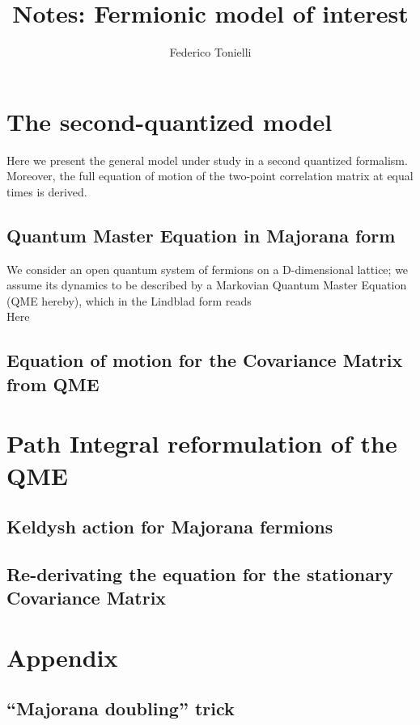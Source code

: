 \documentclass[a4paper,11pt]{amsart}
\title{Notes: Fermionic model of interest}
\author{Federico Tonielli}
\newcommand\blankpage{%
    \null
    \thispagestyle{empty}%
    \addtocounter{page}{-1}%
    \newpage}
\begin{document}
 \maketitle
 
 \tableofcontents
 \blankpage
 
 \section{The second-quantized model}
 Here we present the general model under study in a second quantized formalism.  Moreover, the full equation of motion of the two-point correlation matrix at equal times is derived.
  \subsection{Quantum Master Equation in Majorana form}
  We consider an open quantum system of fermions on a D-dimensional lattice; we assume its dynamics to be described by a Markovian Quantum Master Equation (QME hereby), which in the Lindblad form reads
  \[  \]
  Here 
  \subsection{Equation of motion for the Covariance Matrix from QME}
 \section{Path Integral reformulation of the QME}
  \subsection{Keldysh action for Majorana fermions}
  \subsection{Re-derivating the equation for the stationary Covariance Matrix}

  \appendix
  \section*{Appendix}
    \renewcommand{\thesection}{A}
    \subsection{``Majorana doubling'' trick}
   
   
{}
  
\end{document}
